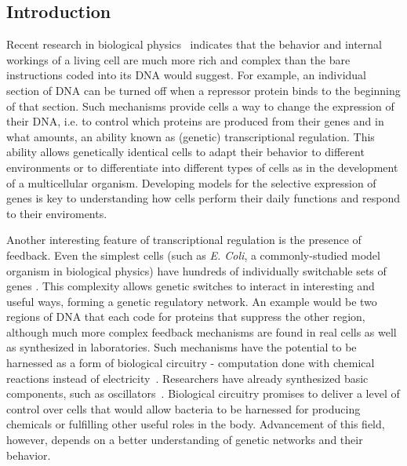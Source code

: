 \documentclass[english,letterpaper,12pt]{article}
\begin{document}
\begin{doublespacing}

\section{Introduction} %
\label{sec:introduction}

Recent research in biological physics~\cite{ecoli-decision} indicates that the behavior and internal workings of a living cell are much more rich and complex than the bare instructions coded into its DNA would suggest. For example, an individual section of DNA can be turned off when a repressor protein binds to the beginning of that section. Such mechanisms provide cells a way to change the expression of their DNA, i.e. to control which proteins are produced from their genes and in what amounts, an ability known as (genetic) transcriptional regulation. This ability allows genetically identical cells to adapt their behavior to different environments or to differentiate into different types of cells as in the development of a multicellular organism. Developing models for the selective expression of genes is key to understanding how cells perform their daily functions and respond to their enviroments.

Another interesting feature of transcriptional regulation is the presence of feedback. Even the simplest cells (such as \textit{E. Coli}, a commonly-studied model organism in biological physics) have hundreds of individually switchable sets of  genes \cite{ecoli-operons}.  This complexity allows genetic switches to interact in interesting and useful ways, forming a genetic regulatory network. An example would be two regions of DNA that each code for proteins that suppress the other region, although much more complex feedback mechanisms are found in real cells as well as synthesized in laboratories.  Such mechanisms have the potential to be harnessed as a form of biological circuitry - computation done with chemical reactions instead of electricity~\cite{bio-circuits}. Researchers have already synthesized basic components, such as oscillators~\cite{synth-osc}. Biological circuitry promises to deliver a level of control over cells that would allow bacteria to be harnessed for producing chemicals or fulfilling other useful roles in the body. Advancement of this field, however, depends on a better understanding of genetic networks and their behavior.


\end{doublespacing}
\end{document}
